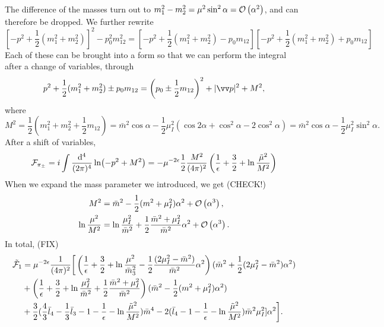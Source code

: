 The difference of the masses turn out to $m_1^2 - m_2^2 = \mu^2 \sin^2\alpha = \Oh[2]{\alpha}$, and can therefore be dropped.
We further rewrite
\begin{equation}
    \left[-p^2 + \frac{1}{2}(m_1^2 + m_2^2)\right]^2 - p_0^2 m_{12}^2
    = \left[-p^2 + \frac{1}{2}(m_1^2 + m_2^2) - p_0 m_{12} \right]
    \left[-p^2 + \frac{1}{2}(m_1^2 + m_2^2) + p_0 m_{12} \right]
\end{equation}
Each of these can be brought into a form so that we can perform the integral after a change of variables, through
\begin{equation}
    p^2 + \frac{1}{2}(m_1^2 + m_2^2) \pm p_0 m_{12}
    = \left(p_0 \pm \frac{1}{2}m_{12}\right)^2 + |\vv p|^2 + M^2,
\end{equation}
where
\begin{equation}
    M^2 = \frac{1}{2}\left(m_1^2 +m_2^2 +\frac{1}{2}m_{12}\right)
    = \bar m^2 \cos\alpha - \frac{1}{2} \mu_I^2 (\cos 2\alpha + \cos^2 \alpha - 2\cos^2\alpha)
    = \bar m^2 \cos\alpha - \frac{1}{2} \mu_I^2 \sin^2 \alpha.
\end{equation}
After a shift of variables,
\begin{equation}
    \Ef_{\pi_\pm}
    = i \int \frac{\dd^4}{(2\pi)^4}
    \ln(-p^2 + M^2)
    = 
    - \mu^{-2\epsilon}\frac{1}{2} \frac{M^2}{(4 \pi)^2}
    \left(\frac{1}{\epsilon} + \frac{3}{2} + \ln \frac{\tilde \mu^2}{M^2}\right)
\end{equation}
When we expand the mass parameter we introduced, we get (CHECK!)
\begin{align}
    M^2 
    &= \bar m^2 -\frac{1}{2}(m^2 + \mu_I^2) \alpha^2 + \Oh[3]{\alpha}, \\
    \ln \frac{\mu^2}{M^2} 
    &= \ln \frac{\mu_I^2}{\bar m^2} + \frac{1}{2}\frac{\bar m^2 + \mu_I^2}{\bar m^2}\alpha^2
    + \Oh[3]{\alpha}.
\end{align}
In total, (FIX)
\begin{align}
    \tilde \Ef_1
    & = 
    \mu^{-2\epsilon} \frac{1}{(4\pi)^2}
    \bigg[
        \left(
            \frac{1}{\epsilon} + \frac{3}{2} +\ln \frac{\mu^2}{\bar m_3^2} - \frac{1}{2} \frac{(2\mu_I^2 - \bar m^2)}{\bar m^2}\alpha^2
        \right)(\bar m^2 + \frac{1}{2}(2\mu_I^2 - \bar m^2)\alpha^2)
        \\
        & +
        \left(
            \frac{1}{\epsilon} + \frac{3}{2} +\ln \frac{\mu_I^2}{\bar m^2} + \frac{1}{2}\frac{\bar m^2 + \mu_I^2}{\bar m^2}
        \right)(\bar m^2 -\frac{1}{2}(m^2 + \mu_I^2) \alpha^2)
        \\
        &
        +
        \frac{3}{2}
        (
            \frac{4}{3}\bar l_4 - \frac{1}{3}\bar l_3 - 1 - \frac{1}{\epsilon} - \ln\frac{\tilde \mu^2}{M^2}
        )\bar m^4
        -2(\bar l_4 - 1 - \frac{1}{\epsilon} - \ln\frac{\tilde \mu^2}{M^2}) \bar m^2\mu_I^2]\alpha^2
    \bigg].
\end{align}
